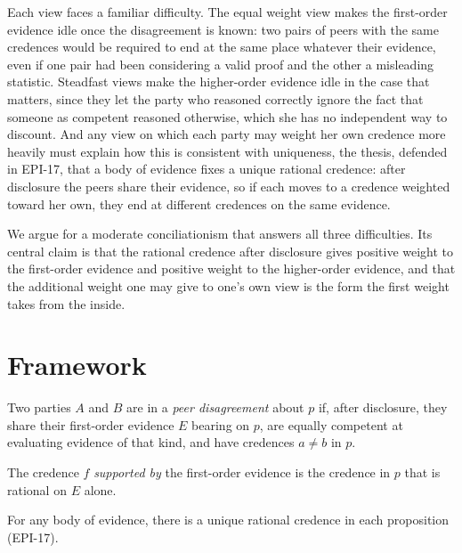 \documentclass{situationist-preprint}
\begin{document}
Each view faces a familiar difficulty. The equal weight view makes the first-order evidence idle once the disagreement is known: two pairs of peers with the same credences would be required to end at the same place whatever their evidence, even if one pair had been considering a valid proof and the other a misleading statistic. Steadfast views make the higher-order evidence idle in the case that matters, since they let the party who reasoned correctly ignore the fact that someone as competent reasoned otherwise, which she has no independent way to discount. And any view on which each party may weight her own credence more heavily must explain how this is consistent with uniqueness, the thesis, defended in EPI-17, that a body of evidence fixes a unique rational credence: after disclosure the peers share their evidence, so if each moves to a credence weighted toward her own, they end at different credences on the same evidence.

We argue for a moderate conciliationism that answers all three difficulties. Its central claim is that the rational credence after disclosure gives positive weight to the first-order evidence and positive weight to the higher-order evidence, and that the additional weight one may give to one's own view is the form the first weight takes from the inside.

\section{Framework}

\begin{definition}\label{d:peer}
Two parties $A$ and $B$ are in a \emph{peer disagreement} about $p$ if, after disclosure, they share their first-order evidence $E$ bearing on $p$, are equally competent at evaluating evidence of that kind, and have credences $a \neq b$ in $p$.
\end{definition}

\begin{definition}\label{d:support}
The credence $f$ \emph{supported by} the first-order evidence is the credence in $p$ that is rational on $E$ alone.
\end{definition}

\begin{assumption}[Uniqueness]\label{a:unique}
For any body of evidence, there is a unique rational credence in each proposition (EPI-17).
\end{assumption}
\end{document}
